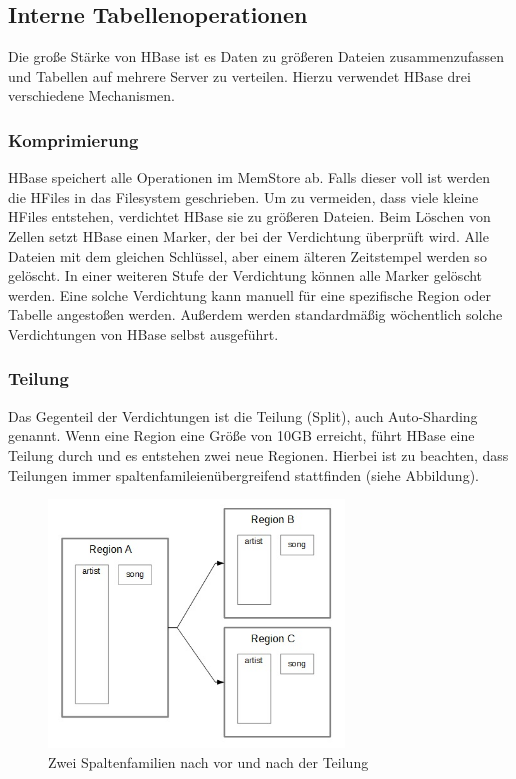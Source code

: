 \subsection{Interne Tabellenoperationen}
Die große Stärke von HBase ist es Daten zu größeren Dateien zusammenzufassen und Tabellen auf mehrere Server zu verteilen. Hierzu verwendet HBase drei verschiedene Mechanismen.

\subsubsection{Komprimierung}\label{komprimierung}
HBase speichert alle Operationen im MemStore ab. Falls dieser voll ist werden die HFiles in das Filesystem geschrieben. Um zu vermeiden, dass viele kleine HFiles entstehen, verdichtet HBase sie zu größeren Dateien. Beim Löschen von Zellen setzt HBase einen Marker, der bei der Verdichtung überprüft wird. Alle Dateien mit dem gleichen Schlüssel, aber einem älteren Zeitstempel werden so gelöscht. In einer weiteren Stufe der Verdichtung können alle Marker gelöscht werden. Eine solche Verdichtung kann manuell für eine spezifische Region oder Tabelle angestoßen werden. Außerdem werden standardmäßig wöchentlich solche Verdichtungen von HBase selbst ausgeführt.

\subsubsection{Teilung}
Das Gegenteil der Verdichtungen ist die Teilung (Split), auch Auto-Sharding genannt. Wenn eine Region eine Größe von 10GB erreicht, führt HBase eine Teilung durch und es entstehen zwei neue Regionen. Hierbei ist zu beachten, dass Teilungen immer spaltenfamileienübergreifend stattfinden (siehe Abbildung).

\begin{figure}[htbp] 
  \centering
     \includegraphics[width=0.7\textwidth]{images/split.jpg}
  \caption{Zwei Spaltenfamilien nach vor und nach der Teilung}
  \label{fig:Teilung}
\end{figure}


